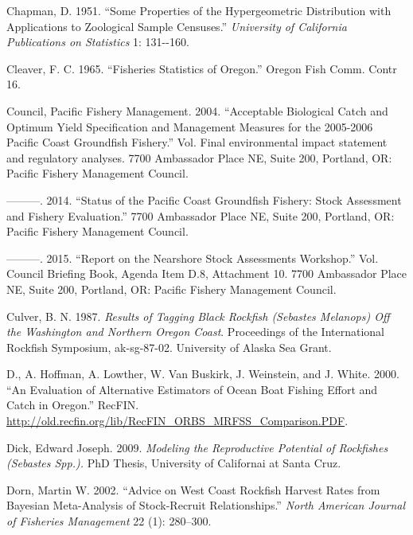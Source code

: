 \documentclass[11pt,
  english,
  letterpaper,
]{article}
\newlength{\cslhangindent}
\newenvironment{CSLReferences}[2] %
 {%
  \setlength{\parindent}{0pt}
  \ifodd #1 \everypar{\setlength{\hangindent}{\cslhangindent}}\ignorespaces\fi
  \ifnum #2 > 0
  \setlength{\parskip}{#2\baselineskip}
  \fi
 }%
 {}
\begin{document}
\begin{CSLReferences}{1}{0}
\leavevmode{}%
Chapman, D. 1951. {``Some Properties of the Hypergeometric Distribution with Applications to Zoological Sample Censuses.''} \emph{University of California Publications on Statistics} 1: 131-\/-160.

\leavevmode{}%
Cleaver, F. C. 1965. {``Fisheries Statistics of Oregon.''} Oregon Fish Comm. Contr 16.

\leavevmode{}%
Council, Pacific Fishery Management. 2004. {``Acceptable Biological Catch and Optimum Yield Specification and Management Measures for the 2005-2006 Pacific Coast Groundfish Fishery.''} Vol. Final environmental impact statement and regulatory analyses. 7700 Ambassador Place NE, Suite 200, Portland, OR: Pacific Fishery Management Council.

\leavevmode{}%
---------. 2014. {``Status of the Pacific Coast Groundfish Fishery: Stock Assessment and Fishery Evaluation.''} 7700 Ambassador Place NE, Suite 200, Portland, OR: Pacific Fishery Management Council.

\leavevmode{}%
---------. 2015. {``Report on the Nearshore Stock Assessments Workshop.''} Vol. Council Briefing Book, Agenda Item D.8, Attachment 10. 7700 Ambassador Place NE, Suite 200, Portland, OR: Pacific Fishery Management Council.

\leavevmode{}%
Culver, B. N. 1987. \emph{Results of Tagging Black Rockfish (Sebastes Melanops) Off the Washington and Northern Oregon Coast}. Proceedings of the International Rockfish Symposium, ak-sg-87-02. University of Alaska Sea Grant.

\leavevmode{}%
D., A. Hoffman, A. Lowther, W. Van Buskirk, J. Weinstein, and J. White. 2000. {``An Evaluation of Alternative Estimators of Ocean Boat Fishing Effort and Catch in Oregon.''} RecFIN. \url{http://old.recfin.org/lib/RecFIN_ORBS_MRFSS_Comparison.PDF}.

\leavevmode{}%
Dick, Edward Joseph. 2009. \emph{Modeling the {Reproductive} {Potential} of {Rockfishes} (\emph{Sebastes} {Spp}.).} PhD Thesis, University of Californai at Santa Cruz.

\leavevmode{}%
Dorn, Martin W. 2002. {``Advice on {West} {Coast} Rockfish Harvest Rates from {B}ayesian Meta-Analysis of Stock-Recruit Relationships.''} \emph{North American Journal of Fisheries Management} 22 (1): 280--300.


\end{CSLReferences}
\end{document}
